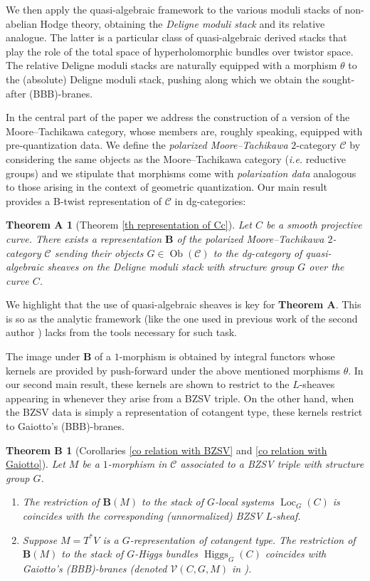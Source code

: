 \documentclass[11pt, a4paper]{amsart}
\numberwithin{equation}{section}
\newtheorem*{theorem_A}{Theorem A}
\newtheorem*{theorem_B}{Theorem B}
\theoremstyle{definition}
\theoremstyle{remark}
\DeclareMathOperator{\Higgs}{Higgs}
\DeclareMathOperator{\Loc}{Loc}
\DeclareMathOperator{\Ob}{Ob}
\newcommand{\Cc}{\mathcal{C}}
\newcommand{\bB}{\mathbf{B}}
\begin{document}
We then apply the quasi-algebraic framework to the various moduli stacks of non-abelian Hodge theory, obtaining the {\it Deligne moduli stack} and its relative analogue. The latter is a particular class of quasi-algebraic derived stacks that play the role of the total space of hyperholomorphic bundles over twistor space. The relative Deligne moduli stacks are naturally equipped with a morphism $\theta$ to the (absolute) Deligne moduli stack, pushing along which we obtain the sought-after (BBB)-branes. 

In the central part of the paper we address the construction of a version of the Moore--Tachikawa category, whose members are, roughly speaking, equipped with pre-quantization data. We define the {\it polarized Moore--Tachikawa} $2$-category $\Cc$ by considering the same objects as the Moore--Tachikawa category ({\it i.e.} reductive groups) and we stipulate that morphisms come with \textit{polarization data} analogous to those arising in the context of geometric quantization. Our main result provides a B-twist representation of $\Cc$ in dg-categories: 

\begin{theorem_A}[Theorem \ref{th representation of Cc}]
Let $C$ be a smooth projective curve. There exists a representation $\bB$ of the polarized Moore--Tachikawa $2$-category $\Cc$ sending their objects $G \in \Ob(\Cc)$ to the dg-category of quasi-algebraic sheaves on the Deligne moduli stack with structure group $G$ over the curve $C$. 
\end{theorem_A}

We highlight that the use of quasi-algebraic sheaves is key for {\bf Theorem A}. This is so as the analytic framework (like the one used in previous work of the second author \cite{franco&hanson}) lacks from the tools necessary for such task.

The image under $\bB$ of a $1$-morphism is obtained by integral functors whose kernels are provided by push-forward under the above mentioned morphisms $\theta$. In our second main result, these kernels are shown to restrict to the $L$-sheaves appearing in \cite{BZSV} whenever they arise from a BZSV triple. On the other hand, when the BZSV data is simply a representation of cotangent type, these kernels restrict to Gaiotto's (BBB)-branes.

\begin{theorem_B}[Corollaries \ref{co relation with BZSV} and \ref{co relation with Gaiotto}]
Let $M$ be a $1$-morphism in $\Cc$ associated to a BZSV triple with structure group $G$. 
\begin{enumerate}
    \item The restriction of $\bB(M)$ to the stack of $G$-local systems $\Loc_G(C)$ is coincides with the corresponding (unnormalized) BZSV $L$-sheaf.
    \item Suppose $M = T^*V$ is a $G$-representation of cotangent type. The restriction of $\bB(M)$ to the stack of $G$-Higgs bundles $\Higgs_G(C)$ coincides with Gaiotto's (BBB)-branes (denoted $\mathcal{V}(C,G,M)$ in \cite{Gaiotto}). 
\end{enumerate}
\end{theorem_B}
\end{document}
